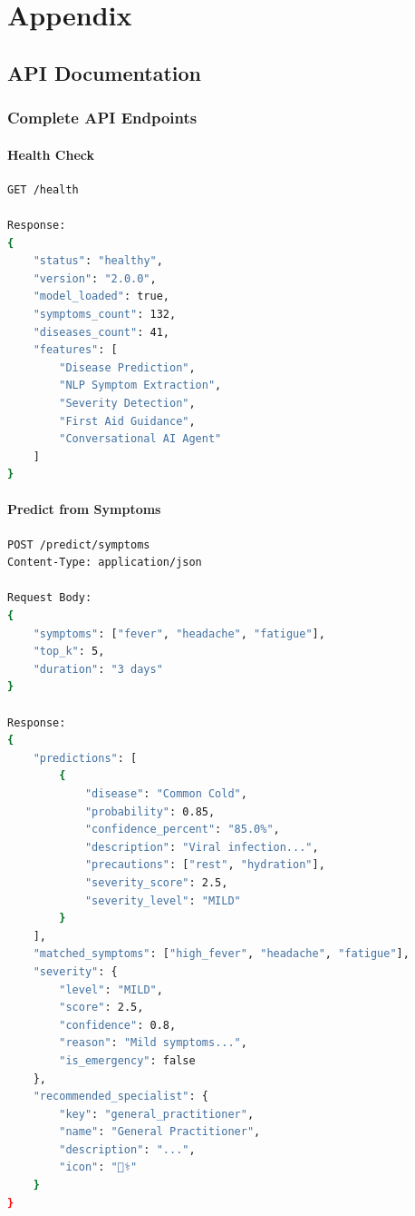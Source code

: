 \chapter{Appendix}

\section{API Documentation}
\subsection{Complete API Endpoints}

\subsubsection{Health Check}
\begin{lstlisting}[language=bash, caption=Health Check Endpoint]
GET /health

Response:
{
    "status": "healthy",
    "version": "2.0.0",
    "model_loaded": true,
    "symptoms_count": 132,
    "diseases_count": 41,
    "features": [
        "Disease Prediction",
        "NLP Symptom Extraction",
        "Severity Detection",
        "First Aid Guidance",
        "Conversational AI Agent"
    ]
}
\end{lstlisting}

\subsubsection{Predict from Symptoms}
\begin{lstlisting}[language=bash, caption=Predict from Symptoms]
POST /predict/symptoms
Content-Type: application/json

Request Body:
{
    "symptoms": ["fever", "headache", "fatigue"],
    "top_k": 5,
    "duration": "3 days"
}

Response:
{
    "predictions": [
        {
            "disease": "Common Cold",
            "probability": 0.85,
            "confidence_percent": "85.0%",
            "description": "Viral infection...",
            "precautions": ["rest", "hydration"],
            "severity_score": 2.5,
            "severity_level": "MILD"
        }
    ],
    "matched_symptoms": ["high_fever", "headache", "fatigue"],
    "severity": {
        "level": "MILD",
        "score": 2.5,
        "confidence": 0.8,
        "reason": "Mild symptoms...",
        "is_emergency": false
    },
    "recommended_specialist": {
        "key": "general_practitioner",
        "name": "General Practitioner",
        "description": "...",
        "icon": "👨‍⚕️"
    }
}
\end{lstlisting}

